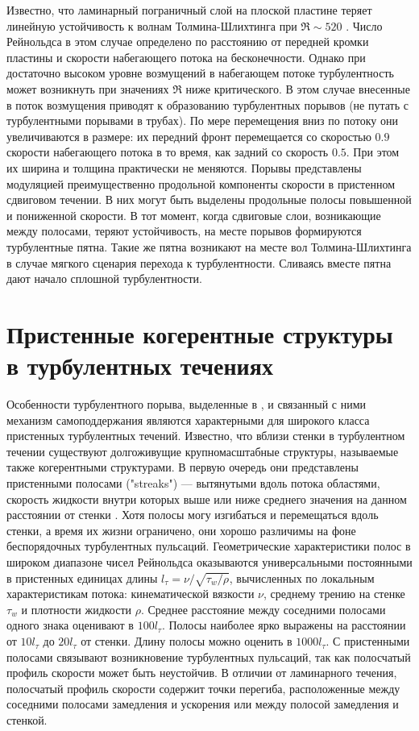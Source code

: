 Известно, что ламинарный пограничный слой на плоской пластине теряет линейную устойчивость к волнам Толмина-Шлихтинга при $\Re \sim 520$ \cite{Schlichting2004}. Число Рейнольдса в этом случае определено по расстоянию от передней кромки пластины и скорости набегающего потока на бесконечности. Однако при достаточно высоком уровне возмущений в набегающем потоке турбулентность может возникнуть при значениях $\Re$ ниже критического. В этом случае внесенные в поток возмущения приводят к образованию турбулентных порывов \cite{Katasonov2014} (не путать с турбулентными порывами в трубах). По мере перемещения вниз по потоку они увеличиваются в размере: их передний фронт перемещается со скоростью $0.9$ скорости набегающего потока в то время, как задний со скорость $0.5$. При этом их ширина и толщина практически не меняются. Порывы представлены модуляцией преимущественно продольной компоненты скорости в пристенном сдвиговом течении. В них могут быть выделены продольные полосы повышенной и пониженной скорости. В тот момент, когда сдвиговые слои, возникающие между полосами, теряют устойчивость, на месте порывов формируются турбулентные пятна. Такие же пятна возникают на месте вол Толмина-Шлихтинга в случае мягкого сценария перехода к турбулентности. Сливаясь вместе пятна дают начало сплошной турбулентности. 


\section{Пристенные когерентные структуры в турбулентных течениях} \label{structure_subsection}

Особенности турбулентного порыва, выделенные в \cite{Shimizu2009}, и связанный с ними механизм самоподдержания являются характерными для широкого класса пристенных турбулентных течений. Известно, что вблизи стенки в турбулентном течении существуют долгоживущие крупномасштабные структуры, называемые также когерентными структурами. В первую очередь они представлены пристенными полосами ("streaks") --- вытянутыми вдоль потока областями, скорость жидкости внутри которых выше или ниже среднего значения на данном расстоянии от стенки \cite{Klebanoff1962, Kline1967}. Хотя полосы могу изгибаться и перемещаться вдоль стенки, а время их жизни ограничено, они хорошо различимы на фоне беспорядочных турбулентных пульсаций. Геометрические характеристики полос в широком диапазоне чисел Рейнольдса оказываются универсальными постоянными в пристенных единицах длины $l_\tau = \nu / \sqrt{\tau_{w} / \rho}$, вычисленных по локальным характеристикам потока: кинематической вязкости $\nu$, среднему трению на стенке $\tau_{w}$ и плотности жидкости $\rho$. Среднее расстояние между соседними полосами одного знака оценивают в $100 l_\tau$. Полосы наиболее ярко выражены на расстоянии от $10 l_\tau$ до $20 l_\tau$ от стенки. Длину полосы можно оценить в $1000 l_\tau$. С пристенными полосами связывают возникновение турбулентных пульсаций, так как полосчатый профиль скорости может быть неустойчив. В отличии от ламинарного течения, полосчатый профиль скорости содержит точки перегиба, расположенные между соседними полосами замедления и ускорения или между полосой замедления и стенкой. 


